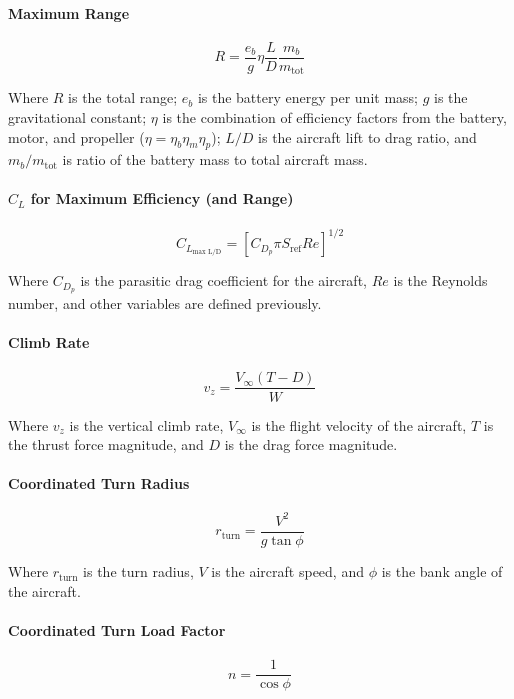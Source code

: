\documentclass[report]{byu-aero}
\begin{document}
\paragraph{Maximum Range}

\[R = \frac{e_b}{g} \eta \frac{L}{D} \frac{m_b}{m_\text{tot}}\]

Where \(R\) is the total range; \(e_b\) is the battery energy per unit mass; \(g\) is the gravitational constant; \(\eta\) is the combination of efficiency factors from the battery, motor, and propeller (\(\eta=\eta_b\eta_m\eta_p\)); \(L/D\) is the aircraft lift to drag ratio, and \(m_b/m_\text{tot}\) is ratio of the battery mass to total aircraft mass.

\paragraph{\(C_L\) for Maximum Efficiency (and Range)}

\[C_{L_\text{max L/D}} = \left[ C_{D_p} \pi S_\text{ref} Re \right]^{1/2}\]

Where \(C_{D_p}\) is the parasitic drag coefficient for the aircraft, \(Re\) is the Reynolds number, and other variables are defined previously.


\paragraph{Climb Rate}

\[ v_z = \frac{V_\infty \left(T - D\right)}{W}\]

Where \(v_z\) is the vertical climb rate, \(V_\infty\) is the flight velocity of the aircraft, \(T\) is the thrust force magnitude, and \(D\) is the drag force magnitude.


\paragraph{Coordinated Turn Radius}

\[r_\text{turn} = \frac{V^2}{g \tan\phi}\]

Where \(r_\text{turn}\) is the turn radius, \(V\) is the aircraft speed, and \(\phi\) is the bank angle of the aircraft.

\paragraph{Coordinated Turn Load Factor}

\[n = \frac{1}{\cos\phi}\]
\end{document}
